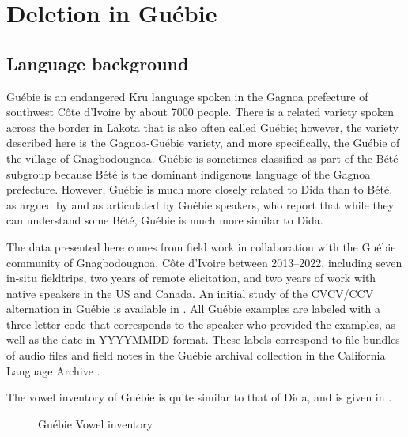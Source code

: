 \documentclass[output=paper,colorlinks,citecolor=brown]{langscibook}
\begin{document}
\section{Deletion in Guébie}\label{sec:guebie}
\subsection{Language background}
Guébie is an endangered Kru language spoken in the Gagnoa prefecture of southwest Côte d'Ivoire by about 7000 people. There is a related variety spoken across the border in Lakota that is also often called Guébie; however, the variety described here is the Gagnoa-Guébie variety, and more specifically, the Guébie of the village of Gnagbodougnoa. Guébie is sometimes classified as part of the Bété subgroup because Bété is the dominant indigenous language of the Gagnoa prefecture. However, Guébie is much more closely related to Dida than to Bété, as argued by \citet{Sande:classification} and as articulated by Guébie speakers, who report that while they can understand some Bété, Guébie is much more similar to Dida.

The data presented here comes from field work in collaboration with the Guébie community of Gnagbodougnoa, Côte d'Ivoire between 2013--2022, including seven in-situ fieldtrips, two years of remote elicitation, and two years of work with native speakers in the US and Canada. An initial study of the CVCV\slash CCV alternation in Guébie is available in \citet{Sande:diss}. All Guébie examples are labeled with a three-letter code that corresponds to the speaker who provided the examples, as well as the date in YYYYMMDD format. These labels correspond to file bundles of audio files and field notes in the Guébie archival collection in the California Language Archive \citep{BodjiSande:2014}.

The vowel inventory of Guébie is quite similar to that of Dida, and is given in .

\begin{figure}
\caption{Guébie Vowel inventory} \label{guebieinventory}
\begin{vowel}
\end{vowel}
\end{figure}
\end{document}
